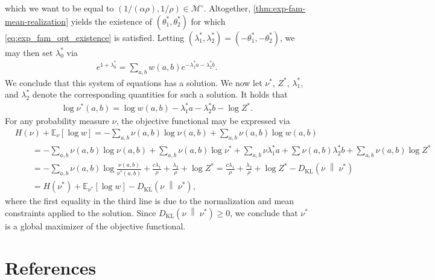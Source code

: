 \documentclass[11pt]{amsart}
\numberwithin{equation}{section}
\numberwithin{equation}{section}
\newcommand{\1}{\mathbbm{1}}
\newcommand{\E}{\mathbb{E}}
\newcommand{\KL}{D_{\mathrm{KL}}}
\newcommand{\doubleline}{\;\middle\|\;}
\theoremstyle{definition}
\begin{document}
\begin{appendices}
which we want to be equal to $(1/(\alpha\rho), 1/\rho) \in \mathcal M^\circ$. Altogether, \cref{thm:exp-fam-mean-realization} yields the existence of $(\theta_1^*, \theta_2^*)$ for which \eqref{eq:exp_fam_opt_existence} is satisfied. Letting $\left( \lambda_1^*, \lambda_2^* \right) = (-\theta_1^*, -\theta_2^*)$, we may then set $\lambda_0^*$ via 
\begin{align*}
    e^{1+\lambda_0^*} = \sum_{a,b} w(a,b) e^{-\lambda_1^* a - \lambda_2^* b}.
\end{align*}
We conclude that this system of equations has a solution. We now let $\nu^*$, $Z^*$, $\lambda_1^*$, and $\lambda_2^*$ denote the corresponding quantities for such a solution. It holds that
\begin{align} \label{eq:optimum_prob_expression}
    \log \nu^*(a,b) = \log w(a,b) - \lambda_1^* a -\lambda_2^* b - \log Z^*.
\end{align}
For any probability measure $\nu$, the objective functional may be expressed via
\begin{align}
    & H(\nu) + \E_\nu\left[ \log w \right] = -\sum_{a,b}\nu(a,b) \log\nu(a,b) + \sum_{a,b} \nu(a,b) \log w(a,b) \nonumber \\
    & \qquad = -\sum_{a,b} \nu(a,b) \log \nu(a,b) + \sum_{a,b} \nu(a,b) \log \nu^* + \sum_{a,b} \nu \lambda_1^*a + \sum \nu(a,b) \lambda_2^* b + \sum_{a,b} \nu(a,b) \log Z^* \nonumber \\
    & \qquad = -\sum_{a,b} \nu(a,b) \log\frac{\nu(a,b)}{\nu^*(a,b)} + \frac{c\lambda_1}{\rho} + \frac{\lambda_2}{\rho} + \log Z^* = \frac{c\lambda_1}{\rho} + \frac{\lambda_2}{\rho} + \log Z^* - \KL\left( \nu \doubleline \nu^* \right) \nonumber \\
    & \qquad = H(\nu^*) + \E_{\nu^*}\left[ \log w \right] - \KL\left( \nu \doubleline \nu^* \right), \label{eq:objective-functional-opt-relation}
\end{align}
where the first equality in the third line is due to the normalization and mean constraints applied to the solution. Since $\KL\left( \nu \doubleline \nu^* \right) \geq 0$, we conclude that $\nu^*$ is a global maximizer of the objective functional.
\end{appendices}

\section*{References}

\printbibliography[heading=none]
\end{document}
